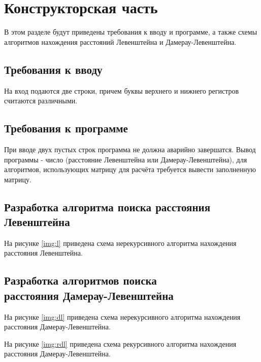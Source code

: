 \chapter{Конструкторская часть}
В этом разделе будут приведены требования к вводу и программе, а также схемы алгоритмов нахождения расстояний Левенштейна и Дамерау-Левенштейна.

\section{Требования к вводу}
На вход подаются две строки, причем буквы верхнего и нижнего регистров считаются различными.

\section{Требования к программе}
При вводе двух пустых строк программа не должна аварийно завершатся. Вывод программы - число (расстояние Левенштейна или Дамерау-Левенштейна), для алгоритмов, использующих матрицу для расчёта требуется вывести заполненную матрицу.

\section{Разработка алгоритма поиска расстояния Левенштейна}

На рисунке \ref{img:l} приведена схема нерекурсивного алгоритма нахождения расстояния Левенштейна.


\newpage

\section{Разработка алгоритмов поиска \\ расстояния Дамерау-Левенштейна}

На рисунке \ref{img:dl} приведена схема нерекурсивного алгоритма нахождения расстояния Дамерау-Левенштейна.


\newpage

На рисунке \ref{img:rdl} приведена схема рекурсивного алгоритма нахождения расстояния Дамерау-Левенштейна.


